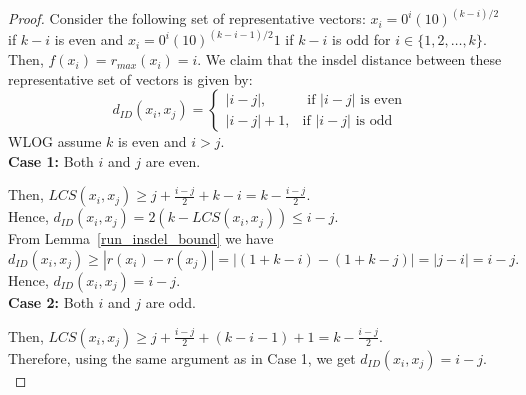 \documentclass[10pt,a4paper]{amsart}
\begin{document}
    \begin{proof}
        Consider the following set of representative vectors: $x_i =0^i(10)^{(k-i)/2}$ if $k-i$ is even and $x_i =0^i(10)^{(k-i-1)/2}1$ if $k-i$ is odd for $i \in \{1,2,\ldots,k\}$. Then, $f(x_i) = r_{max}(x_i) = i$. We claim that the insdel distance between these representative set of vectors is given by:
        \[
            d_{ID}(x_i, x_j) =
            \begin{cases}
                |i-j|, & \text{ if $|i-j|$ is even}\\
                |i - j| + 1, & \text{if $|i-j|$ is odd}
            \end{cases}
        \]
        WLOG assume $k$ is even and $i > j$.\\
        \noindent \textbf{Case 1:} Both $i$ and $j$ are even.
        
        \smallskip
        \noindent Then, $LCS(x_i,x_j) \geq j + \frac{i-j}{2} + k- i = k - \frac{i-j}{2}.$\\
        Hence, $d_{ID}(x_i,x_j) = 2(k - LCS(x_i,x_j)) \leq i-j$.\\
        From Lemma~\ref{run_insdel_bound} we have $d_{ID}(x_i,x_j) \geq |r(x_i) - r(x_j)| = |(1 + k -i) -(1 + k - j)| = |j-i| = i-j.$\\
        Hence, $d_{ID}(x_i, x_j) = i-j$.\\
        
        \noindent \textbf{Case 2:} Both $i$ and $j$ are odd.
        
        \smallskip
        \noindent Then, $LCS(x_i,x_j) \geq j + \frac{i-j}{2} + ( k- i-1) +1 = k - \frac{i-j}{2}.$\\
        Therefore, using the same argument as in Case 1, we get $d_{ID}(x_i, x_j) = i-j$.\\
        
        

\end{proof}
\end{document}
